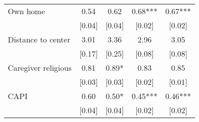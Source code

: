 \begin{table}[H]
\begin{adjustbox}{max height=\dimexpr\textheight-5.5cm\relax,max width=\textwidth}
\begin{tabular}{l cccc}
Own home  & 0.54 & 0.62 & 0.68*** & 0.67*** \\
 & [0.04] & [0.04] & [0.02] & [0.02] \\
Distance to center  & 3.01 & 3.36 & 2.96 & 3.05 \\
 & [0.17] & [0.25] & [0.08] & [0.08] \\
Caregiver religious  & 0.81 & 0.89* & 0.83 & 0.85 \\
 & [0.03] & [0.03] & [0.02] & [0.01] \\
CAPI  & 0.60 & 0.50* & 0.45*** & 0.46*** \\
 & [0.04] & [0.04] & [0.02] & [0.02] \\
\hline
\end{tabular}
\end{adjustbox}

\end{table}
